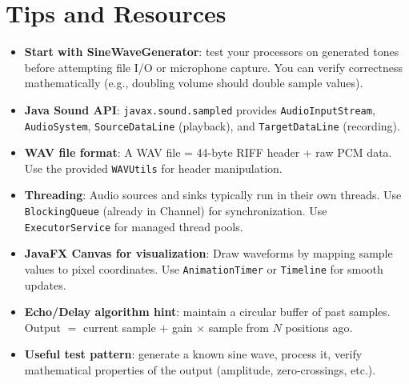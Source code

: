 \documentclass[a4paper,12pt]{article}
\begin{document}
\section{Tips and Resources}

\begin{itemize}
    \item \textbf{Start with SineWaveGenerator}: test your processors on generated tones
          before attempting file I/O or microphone capture. You can verify correctness
          mathematically (e.g., doubling volume should double sample values).

    \item \textbf{Java Sound API}: \texttt{javax.sound.sampled} provides
          \texttt{AudioInputStream}, \texttt{AudioSystem}, \texttt{SourceDataLine} (playback),
          and \texttt{TargetDataLine} (recording).

    \item \textbf{WAV file format}: A WAV file = 44-byte RIFF header + raw PCM data.
          Use the provided \texttt{WAVUtils} for header manipulation.

    \item \textbf{Threading}: Audio sources and sinks typically run in their own threads.
          Use \texttt{BlockingQueue} (already in Channel) for synchronization.
          Use \texttt{ExecutorService} for managed thread pools.

    \item \textbf{JavaFX Canvas for visualization}: Draw waveforms by mapping sample values
          to pixel coordinates. Use \texttt{AnimationTimer} or \texttt{Timeline}
          for smooth updates.

    \item \textbf{Echo/Delay algorithm hint}: maintain a circular buffer of past samples.
          Output $= $ current sample $+$ gain $\times$ sample from $N$ positions ago.

    \item \textbf{Useful test pattern}: generate a known sine wave, process it,
          verify mathematical properties of the output (amplitude, zero-crossings, etc.).
\end{itemize}
\end{document}
